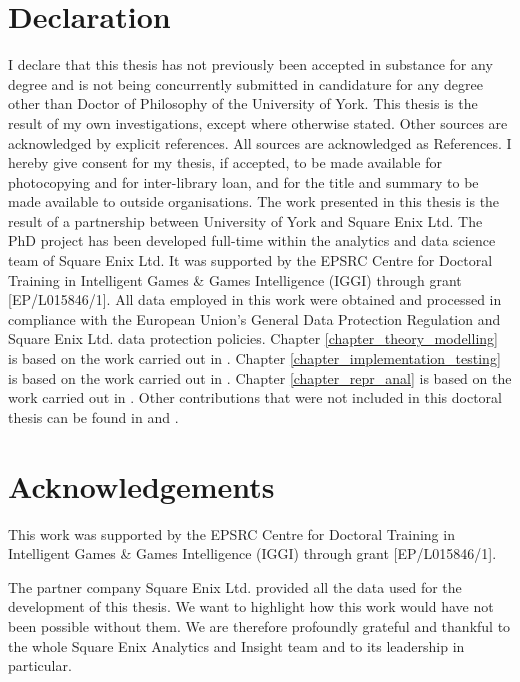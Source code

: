 \documentclass{yorkThesis}
\begin{document}
\chapter*{Declaration}
\label{declaration}
 I declare that this thesis has not previously been accepted in substance for any degree and is not being concurrently submitted in candidature for any degree other than Doctor of Philosophy of the University of York. This thesis is the result of my own investigations, except where otherwise stated. Other sources are acknowledged by explicit references. All sources are acknowledged as References. I hereby give consent for my thesis, if accepted, to be made available for photocopying and for inter-library loan, and for the title and summary to be made available to outside organisations. The work presented in this thesis is the result of a partnership between University of York and Square Enix Ltd. The PhD project has been developed full-time within the analytics and data science team of Square Enix Ltd. It was supported by the EPSRC Centre for Doctoral Training in Intelligent Games \& Games Intelligence (IGGI) through grant [EP/L015846/1]. All data employed in this work were obtained and processed in compliance with the European Union's General Data Protection Regulation \cite{EUdataregulations2018} and Square Enix Ltd. data protection policies. Chapter \ref{chapter_theory_modelling} is based on the work carried out in \cite{bonometti2020theory, bonometti2021approximating}. Chapter \ref{chapter_implementation_testing} is based on the work carried out in \cite{bonometti2019modelling, bonometti2020theory, bonometti2021approximating}. Chapter \ref{chapter_repr_anal} is based on the work carried out in \cite{bonometti2021approximating}. Other contributions that were not included in this doctoral thesis can be found in \cite{aung2018predicting} and \cite{vardal2022mind}.
 
\chapter*{Acknowledgements}
\label{acknowledgements}
This work was supported by the EPSRC Centre for Doctoral Training in Intelligent Games \& Games Intelligence (IGGI) through grant [EP/L015846/1]. 

The partner company Square Enix Ltd. provided all the data used for the development of this thesis. We want to highlight how this work would have not been possible without them. We are therefore profoundly grateful and thankful to the whole Square Enix Analytics and Insight team and to its leadership in particular.
\end{document}
